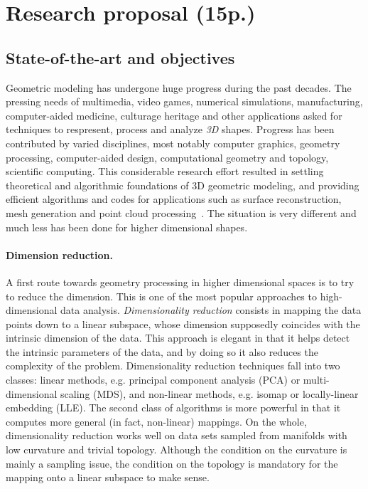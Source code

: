 \section{Research proposal (15p.)}

\subsection{State-of-the-art and objectives}

Geometric modeling has undergone huge progress during the past decades. The pressing needs
of multimedia, video games, numerical simulations, manufacturing, computer-aided medicine, culturage heritage and other applications asked for techniques to respresent, process and analyze
{\em 3D} shapes.  Progress has been contributed by  varied disciplines, most notably computer graphics, geometry processing, computer-aided design, computational geometry and topology, scientific computing. This considerable research effort resulted in settling theoretical and algorithmic foundations of 3D geometric modeling, and providing efficient algorithms and codes for applications such as surface reconstruction, mesh generation and point cloud processing~\cite{geometrica-bcmrv-ms-06,dey-csr-2007}.  
The situation is very different and much less has been done for higher dimensional shapes.%


\paragraph{Dimension reduction.} A first route towards geometry processing in higher dimensional spaces is to try to reduce the dimension. This is 
one of the most popular approaches to high-dimensional data analysis. {\em Dimensionality reduction} consists in mapping the data points down to a linear subspace, whose dimension supposedly coincides with the intrinsic dimension of the data. This approach is elegant in that it helps detect the intrinsic parameters of the data, and by doing so it also reduces the complexity of the problem. Dimensionality reduction techniques fall into two classes: linear methods, e.g. principal component analysis (PCA) or multi-dimensional scaling (MDS), and non-linear methods, e.g. isomap or locally-linear embedding (LLE). The second class of algorithms is more powerful in that it computes more general (in fact, non-linear) mappings. On the whole, dimensionality reduction works well on data sets sampled from manifolds with low curvature and trivial topology. Although the condition on the curvature is mainly a sampling issue, the condition on the topology is mandatory for the mapping onto a linear subspace to make sense. 

